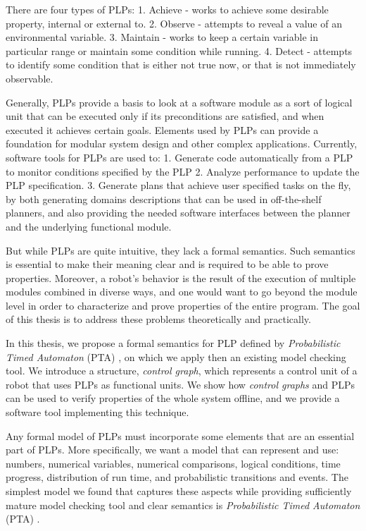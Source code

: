 \par There are four types of PLPs: 1. Achieve - works to achieve some desirable property, internal or external to. 2. Observe - attempts to reveal a value of an environmental variable. 3. Maintain - works to keep a certain variable in particular range or maintain some condition while running. 4. Detect - attempts to identify some condition that is either not true now, or that is not immediately observable. 
\par Generally, PLPs provide a basis to look at a software module as a sort of logical unit that can be executed only if its preconditions are satisfied, and when executed it achieves certain goals. Elements used by PLPs can provide a foundation for modular system design and other complex applications. Currently, software tools for PLPs \cite{brafman2016performance} are used to: 1. Generate code automatically from a PLP to monitor conditions specified by the PLP 2. Analyze performance to update the PLP specification. 3. Generate plans that achieve user specified tasks on the fly, by both generating domains descriptions that can be used in off-the-shelf planners, and also providing the needed software interfaces between the planner and the underlying functional module.
\par But while PLPs are quite intuitive, they lack a formal semantics. Such semantics is essential to make their meaning clear and is required to be able to prove properties. Moreover, a robot’s behavior is the result of the execution of multiple modules combined in diverse ways, and one would want to go beyond the module level in order to characterize and prove properties of the entire program. The goal of this thesis is to address these problems theoretically and practically. 
\par In this thesis, we propose a formal semantics for PLP defined by \textit{Probabilistic Timed Automaton} (PTA) \cite{norman2013model}, on which we apply then an existing model checking tool. We introduce a structure, \textit{control graph}, which represents a control unit of a robot that uses PLPs as functional units. We show how \textit{control graphs} and PLPs can be used to verify properties of the whole system offline, and we provide a software tool implementing this technique.
\par Any formal model of PLPs must incorporate some elements that are an essential part of PLPs. More specifically, we want a model that can represent and use: numbers, numerical variables, numerical comparisons, logical conditions, time progress, distribution of run time, and probabilistic transitions and events. The simplest model we found that captures these aspects while providing sufficiently mature model checking tool and clear semantics is \textit{Probabilistic Timed Automaton} (PTA) \cite{norman2013model}.
